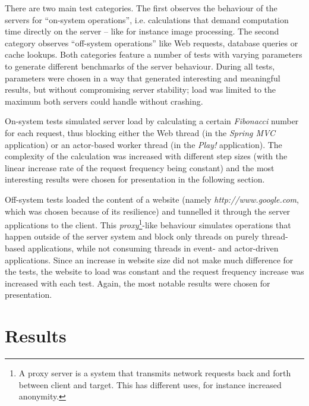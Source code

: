 There are two main test categories. The first observes the behaviour of the servers for ``on-system operations'', i.e. calculations that demand computation time directly on the server -- like for instance image processing. The second category observes ``off-system operations'' like Web requests, database queries or cache lookups. Both categories feature a number of tests with varying parameters to generate different benchmarks of the server behaviour. During all tests, parameters were chosen in a way that generated interesting and meaningful results, but without compromising server stability; load was limited to the maximum both servers could handle without crashing.

On-system tests simulated server load by calculating a certain \textit{Fibonacci} number for each request, thus blocking either the Web thread (in the \textit{Spring MVC} application) or an actor-based worker thread (in the \textit{Play!} application). The complexity of the calculation was increased with different step sizes (with the linear increase rate of the request frequency being constant) and the most interesting results were chosen for presentation in the following section. 

Off-system tests loaded the content of a website (namely \textit{http://www.google.com}, which was chosen because of its resilience) and tunnelled it through the server applications to the client. This \textit{proxy}\footnote{A proxy server is a system that transmits network requests back and forth between client and target. This has different uses, for instance increased anonymity.}-like behaviour simulates operations that happen outside of the server system and block only threads on purely thread-based applications, while not consuming threads in event- and actor-driven applications. Since an increase in website size did not make much difference for the tests, the website to load was constant and the request frequency increase was increased with each test. Again, the most notable results were chosen for presentation.

\section{Results}
